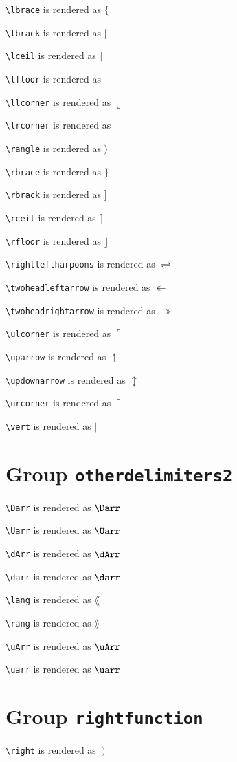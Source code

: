 \texttt{\textbackslash lbrace} is rendered as $\lbrace$

\texttt{\textbackslash lbrack} is rendered as $\lbrack$

\texttt{\textbackslash lceil} is rendered as $\lceil$

\texttt{\textbackslash lfloor} is rendered as $\lfloor$

\texttt{\textbackslash llcorner} is rendered as $\llcorner$

\texttt{\textbackslash lrcorner} is rendered as $\lrcorner$

\texttt{\textbackslash rangle} is rendered as $\rangle$

\texttt{\textbackslash rbrace} is rendered as $\rbrace$

\texttt{\textbackslash rbrack} is rendered as $\rbrack$

\texttt{\textbackslash rceil} is rendered as $\rceil$

\texttt{\textbackslash rfloor} is rendered as $\rfloor$

\texttt{\textbackslash rightleftharpoons} is rendered as $\rightleftharpoons$

\texttt{\textbackslash twoheadleftarrow} is rendered as $\twoheadleftarrow$

\texttt{\textbackslash twoheadrightarrow} is rendered as $\twoheadrightarrow$

\texttt{\textbackslash ulcorner} is rendered as $\ulcorner$

\texttt{\textbackslash uparrow} is rendered as $\uparrow$

\texttt{\textbackslash updownarrow} is rendered as $\updownarrow$

\texttt{\textbackslash urcorner} is rendered as $\urcorner$

\texttt{\textbackslash vert} is rendered as $\vert$

\section{ Group \texttt{other\textunderscore delimiters2}}

\texttt{\textbackslash Darr} is rendered as $\Darr$

\texttt{\textbackslash Uarr} is rendered as $\Uarr$

\texttt{\textbackslash dArr} is rendered as $\dArr$

\texttt{\textbackslash darr} is rendered as $\darr$

\texttt{\textbackslash lang} is rendered as $\lang$

\texttt{\textbackslash rang} is rendered as $\rang$

\texttt{\textbackslash uArr} is rendered as $\uArr$

\texttt{\textbackslash uarr} is rendered as $\uarr$

\section{ Group \texttt{right\textunderscore function}}

\texttt{\textbackslash right} is rendered as $\left. \right)$